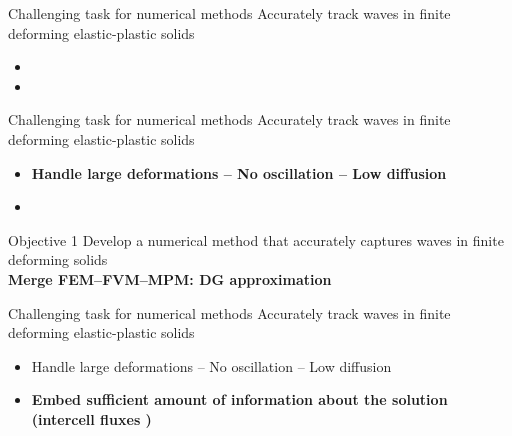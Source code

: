 \begin{withoutheadline}
  \begin{frame}{\text{  }}
    \vspace{-0.4cm}
    \begin{overprint}
      \begin{block}{Challenging task for numerical methods}
        \alert{Accurately track waves in finite deforming elastic-plastic solids}
        \begin{itemize}
          \item[]
        \item[]
        \end{itemize}
      \end{block}
      \begin{block}{Challenging task for numerical methods}
        \alert{Accurately track waves in finite deforming elastic-plastic solids}
        \begin{itemize}
        \item[1-] \textbf{Handle large deformations -- No oscillation -- Low diffusion}
          \item[]
        \end{itemize}
      \end{block}
      \begin{block}{Objective 1}
        Develop a numerical method that accurately captures waves in finite deforming solids \\
        \textbf{Merge FEM--FVM--MPM: DG approximation}
      \end{block}
      \begin{block}{Challenging task for numerical methods}
        \alert{Accurately track waves in finite deforming elastic-plastic solids}
        \begin{itemize}
        \item[1-] Handle large deformations -- No oscillation -- Low diffusion
        \item[2-] \textbf{Embed sufficient amount of information about the solution (intercell fluxes \cite{Thomas_EP})}

\end{itemize}
\end{block}
\end{overprint}
\end{frame}
\end{withoutheadline}
